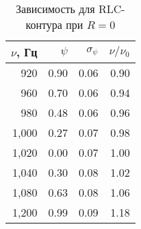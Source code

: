 \begin{table} 
 \caption{Зависимость для RLC-контура при $R = 0$}
 \label{RLCtable1}
 \begin{center}
\begin{tabular}{|*{4}{r|}}
\hline 
$\nu$, Гц & $\psi$ & $\sigma_\psi$ & $\nu / \nu_0$ \\ \hline 
 920 & 0.90 & 0.06 & 0.90 \\ \hline 
 960 & 0.70 & 0.06 & 0.94 \\ \hline 
 980 & 0.48 & 0.06 & 0.96 \\ \hline 
 1,000 & 0.27 & 0.07 & 0.98 \\ \hline 
 1,020 & 0.00 & 0.07 & 1.00 \\ \hline 
 1,040 & 0.30 & 0.08 & 1.02 \\ \hline 
 1,080 & 0.63 & 0.08 & 1.06 \\ \hline 
 1,200 & 0.99 & 0.09 & 1.18 \\ \hline 
 \end{tabular}
 \end{center} 
\end{table} 
